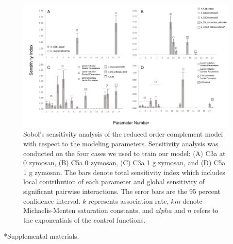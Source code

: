 \documentclass[12pt]{article}
\makeatletter
\renewcommand\section{\@startsection
	{subsection}{2}{0mm}
	{-0.2in}
	{0.05\baselineskip}
	{\normalfont\large\bfseries}}
\makeatother
\begin{document}
\begin{figure}[h]
\centering
\includegraphics[width=1.0\textwidth]{./figs/Figure4_Sensitivity_Analysis_v5.pdf}
\caption{Sobol's sensitivity analysis of the reduced order complement model with respect to the modeling parameters.  Sensitivity analysis was conducted on the four cases we used to train our model: (A) C3a at 0 zymosan, (B) C5a 0 zymosan, (C) C3a 1 g zymosan, and (D) C5a $1$ g zymosan. The bars denote total sensitivity index which includes local contribution of each parameter and global sensitivity of significant pairwise interactions. The error bars are the 95 percent confidence interval. $k$ represents association rate, $km$ denote Michaelis-Menten saturation constants, and $alpha$ and $n$ refers to the exponentials of the control functions.}\label{fig-SA}
\end{figure}

\clearpage

\renewcommand\thefigure{S\arabic{figure}}
\renewcommand\thetable{T\arabic{table}}
\renewcommand\thepage{S-\arabic{page}}
\renewcommand\theequation{S\arabic{equation}}

\setcounter{equation}{0}
\setcounter{table}{0}
\setcounter{figure}{0}
\setcounter{page}{1}


\section*{Supplemental materials.}
\end{document}
